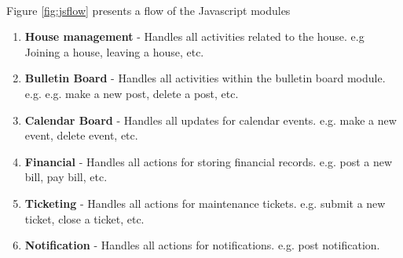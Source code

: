 \documentclass[12pt]{article}
\begin{document}
\

 Figure \ref{fig:jsflow} presents a flow of the Javascript modules
\begin{enumerate}
    \item \textbf{House management} - Handles all activities related to the house. e.g Joining a house, leaving a house, etc.
    \item \textbf{Bulletin Board} - Handles all activities within the bulletin board module. e.g. e.g. make a new post, delete a post, etc.
    \item \textbf{Calendar Board} - Handles all updates  for calendar events. e.g. make a new event, delete event, etc.
    \item \textbf{Financial} - Handles all actions for storing financial records. e.g. post a new bill, pay bill, etc.
    \item \textbf{Ticketing} - Handles all actions for maintenance tickets. e.g. submit a new ticket, close a ticket, etc.
    \item \textbf{Notification} - Handles all actions for notifications. e.g. post notification.
    
    
\end{enumerate}
\end{document}
